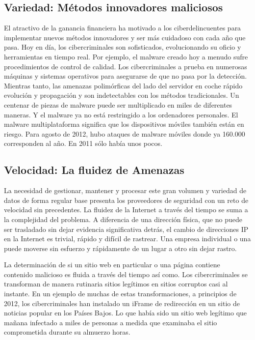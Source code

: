 \documentclass[journal]{IEEEtran}
\begin{document}
\subsection{Variedad: Métodos innovadores maliciosos}
El atractivo de la ganancia financiera ha motivado a los ciberdelincuentes para implementar nuevos métodos innovadores y ser más cuidadoso con cada año que pasa. Hoy en día, los cibercriminales son sofisticados, evolucionando su oficio y herramientas en tiempo real. Por ejemplo, el malware creado hoy a menudo sufre procedimientos de control de calidad. Los cibercriminales a prueba en numerosas máquinas y sistemas operativos para asegurarse de que no pasa por la detección. Mientras tanto, las amenazas polimórficas del lado del servidor en coche rápido evolución y propagación y son indetectables con los métodos tradicionales. Un centenar de piezas de malware puede ser multiplicado en miles de diferentes maneras. Y el malware ya no está restringido a los ordenadores personales. El malware multiplataforma significa que los dispositivos móviles también están en riesgo. Para agosto de 2012, hubo ataques de malware móviles donde ya 160.000 corresponden al año. En 2011 sólo había unos pocos.

\subsection{Velocidad: La fluidez de Amenazas}
La necesidad de gestionar, mantener y procesar este gran volumen y variedad de datos de forma regular base presenta los proveedores de seguridad con un reto de velocidad sin precedentes. La fluidez de la Internet a través del tiempo se suma a la complejidad del problema. A diferencia de una dirección física, que no puede ser trasladado sin dejar evidencia significativa detrás, el cambio de direcciones IP en la Internet es trivial, rápido y difícil de rastrear. Una empresa individual o una puede moverse sin esfuerzo y rápidamente de un lugar a otro sin dejar rastro.

La determinación de si un sitio web en particular o una página contiene contenido malicioso es fluida a través del tiempo así como. Los cibercriminales se transforman de manera rutinaria sitios legítimos en sitios corruptos casi al instante. En un ejemplo de muchas de estas transformaciones, a principios de 2012, los cibercriminales han instalado un iFrame de redirección en un sitio de noticias popular en los Países Bajos. Lo que había sido un sitio web legítimo que mañana infectado a miles de personas a medida que examinaba el sitio comprometida durante su almuerzo horas.
\end{document}
